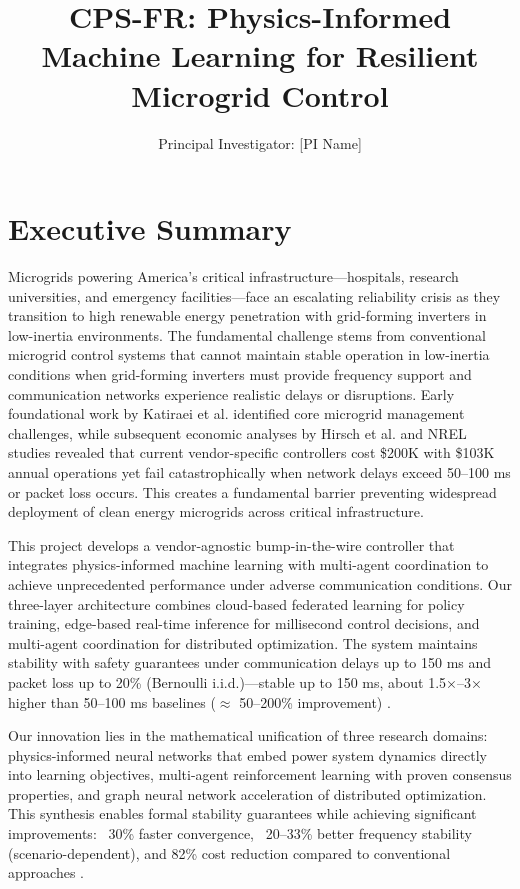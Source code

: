 \documentclass[12pt]{article}
\begin{document}
\title{\Large\textbf{CPS-FR: Physics-Informed Machine Learning for Resilient Microgrid Control}}


\author{Principal Investigator: [PI Name]}

\date{}

\maketitle

\section{Executive Summary}

Microgrids powering America's critical infrastructure---hospitals, research universities, and emergency facilities---face an escalating reliability crisis as they transition to high renewable energy penetration with grid-forming inverters in low-inertia environments. The fundamental challenge stems from conventional microgrid control systems that cannot maintain stable operation in low-inertia conditions when grid-forming inverters must provide frequency support and communication networks experience realistic delays or disruptions. Early foundational work by Katiraei et al. \cite{katiraei2008} identified core microgrid management challenges, while subsequent economic analyses by Hirsch et al. \cite{hirsch2018} and NREL studies \cite{sigrin2019} revealed that current vendor-specific controllers cost \$200K with \$103K annual operations yet fail catastrophically when network delays exceed 50--100 ms or packet loss occurs. This creates a fundamental barrier preventing widespread deployment of clean energy microgrids across critical infrastructure.

This project develops a vendor-agnostic bump-in-the-wire controller that integrates physics-informed machine learning with multi-agent coordination to achieve unprecedented performance under adverse communication conditions. Our three-layer architecture combines cloud-based federated learning for policy training, edge-based real-time inference for millisecond control decisions, and multi-agent coordination for distributed optimization. The system maintains stability with safety guarantees under communication delays up to 150 ms and packet loss up to 20\% (Bernoulli i.i.d.)---stable up to 150 ms, about 1.5×--3× higher than 50--100 ms baselines ($\approx$ 50--200\% improvement) \cite{baseline2023delay}.

Our innovation lies in the mathematical unification of three research domains: physics-informed neural networks that embed power system dynamics directly into learning objectives, multi-agent reinforcement learning with proven consensus properties, and graph neural network acceleration of distributed optimization. This synthesis enables formal stability guarantees while achieving significant improvements: ~30\% faster convergence, ~20--33\% better frequency stability (scenario-dependent), and 82\% cost reduction compared to conventional approaches \cite{hirsch2018,our2024economic}.
\end{document}

